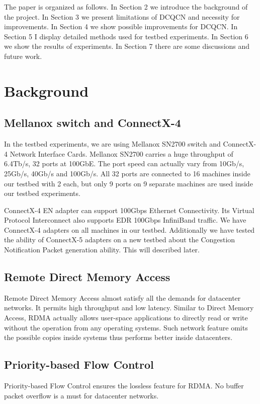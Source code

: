 \documentclass[12pt,a4paper]{article}
\begin{document}
The paper is organized as follows.
In Section 2 we introduce the background of the project.
In Section 3 we present limitations of DCQCN and necessity for improvements.
In Section 4 we show possible improvements for DCQCN.
In Section 5 I display detailed methods used for testbed experiments.
In Section 6 we show the results of experiments.
In Section 7 there are some discussions and future work.

\section{Background}
\subsection{Mellanox switch and ConnectX-4}
In the testbed experiments, we are using Mellanox SN2700 switch and ConnectX-4 Network Interface Cards.
Mellanox SN2700 carries a huge throughput of 6.4Tb/s, 32 ports at 100GbE.
The port speed can actually vary from 10Gb/s, 25Gb/s, 40Gb/s and 100Gb/s.
All 32 ports are connected to 16 machines inside our testbed with 2 each, but only 9 ports on 9 separate machines are used inside our
testbed experiments.

ConnectX-4 EN adapter can support 100Gbps Ethernet Connectivity.
Its Virtual Protocol Interconnect also supports EDR 100Gbps InfiniBand traffic.
We have ConnectX-4 adapters on all machines in our testbed.
Additionally we have tested the ability of ConnectX-5 adapters on a new testbed about the Congestion Notification Packet generation
ability.
This will described later.

\subsection{Remote Direct Memory Access}
Remote Direct Memory Access almost satisfy all the demands for datacenter networks.
It permits high throughput and low latency.
Similar to Direct Memory Access, RDMA actually allows user-space applications to directly read or write without the operation from
any operating systems.
Such network feature omits the possible copies inside systems thus performs better inside datacenters.

\subsection{Priority-based Flow Control}
Priority-based Flow Control ensures the lossless feature for RDMA.
No buffer packet overflow is a must for datacenter networks.
\end{document}
